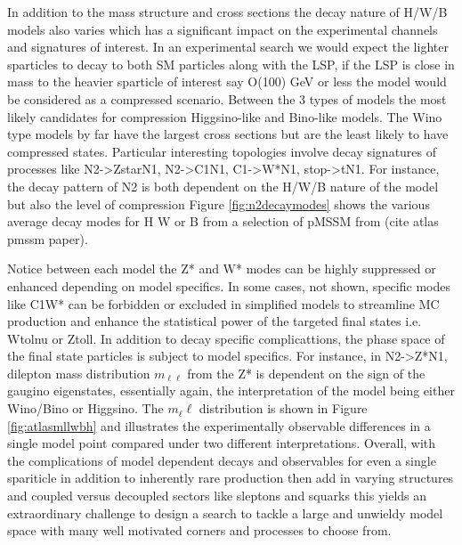 In addition to the mass structure and cross sections the decay nature of H/W/B models also varies which has a significant impact on the experimental channels and signatures of interest. In an experimental search we would expect the lighter sparticles to decay to both SM particles along with the LSP, if the LSP is close in mass to the heavier sparticle of interest say O(100) GeV or less the model would be considered as a compressed scenario. Between the 3 types of models the most likely candidates for compression Higgsino-like and Bino-like models. The Wino type models by far have the largest cross sections but are the least likely to have compressed states. Particular interesting topologies involve decay signatures of processes like N2->ZstarN1, N2->C1N1, C1->W*N1, stop->tN1. For instance, the decay pattern of N2 is both dependent on the H/W/B nature of the model but also the level of compression Figure \ref{fig:n2decaymodes} shows the various average decay modes for H W or B from a selection of pMSSM from (cite atlas pmssm paper).


Notice between each model the Z* and W* modes can be highly suppressed or enhanced depending on model specifics. In some cases, not shown, specific modes like C1W* can be forbidden or excluded in simplified models to streamline MC production and enhance the statistical power of the targeted final states i.e. Wtolnu or Ztoll. In addition to decay specific complicattions, the phase space of the final state particles is subject to model specifics. For instance, in N2->Z*N1, dilepton mass distribution $m_{\ell\ell}$ from the Z* is dependent on the sign of the gaugino eigenstates, essentially again, the interpretation of the model being either Wino/Bino or Higgsino. The $m_\ell\ell$ distribution is shown in Figure \ref{fig:atlasmllwbh} and illustrates the experimentally observable differences in a  single model point compared under two different interpretations. Overall, with the complications of model dependent decays and observables for even a single spariticle in addition to inherently rare production then add in varying structures and coupled versus decoupled sectors like sleptons and squarks this yields an extraordinary challenge to design a search to tackle a large and unwieldy model space with many well motivated corners and processes to choose from. 



